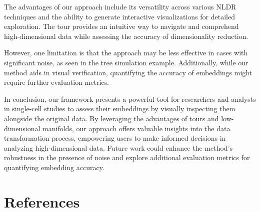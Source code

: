 \documentclass[
  12pt]{article}
\begin{document}
The advantages of our approach include its versatility across various
NLDR techniques and the ability to generate interactive visualizations
for detailed exploration. The tour provides an intuitive way to navigate
and comprehend high-dimensional data while assessing the accuracy of
dimensionality reduction.

However, one limitation is that the approach may be less effective in
cases with significant noise, as seen in the tree simulation example.
Additionally, while our method aids in visual verification, quantifying
the accuracy of embeddings might require further evaluation metrics.

In conclusion, our framework presents a powerful tool for researchers
and analysts in single-cell studies to assess their embeddings by
visually inspecting them alongside the original data. By leveraging the
advantages of tours and low-dimensional manifolds, our approach offers
valuable insights into the data transformation process, empowering users
to make informed decisions in analyzing high-dimensional data. Future
work could enhance the method's robustness in the presence of noise and
explore additional evaluation metrics for quantifying embedding
accuracy.

\hypertarget{references}{%
\section*{References}\label{references}}

\renewcommand{\bibsection}{}


\newpage{}
\end{document}
